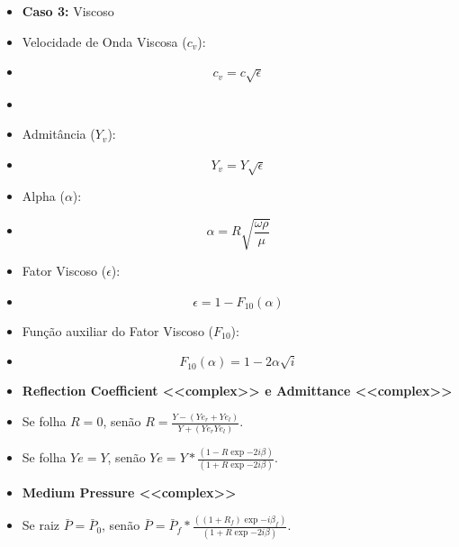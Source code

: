 \documentclass[10pt]{beamer}
\theoremstyle{remark}
\theoremstyle{definition}
\begin{document}
\begin{frame}[allowframebreaks]
\begin{itemize}
		\end{itemize}
		
		
		\framebreak
		
		\begin{itemize}
			\item \textbf{Caso 3:} Viscoso
			\item Velocidade de Onda Viscosa ($c_v$):
			\item 
					\begin{equation}
					  c_v = c\sqrt{\epsilon}
					\label{10}
					\end{equation}
			\item
			\item Admitância ($Y_v$):
			\item 
					\begin{equation}
					Y_v = Y\sqrt{\epsilon}
					\label{11}
					\end{equation}
			
		\end{itemize}
		
		\framebreak
		
		\begin{itemize}
			\item Alpha ($\alpha$):
			\item 
					\begin{equation}
					  \alpha = R \sqrt{\frac{\omega \rho}{\mu}}
					\label{11}
					\end{equation}
			\item Fator Viscoso ($\epsilon$):
			\item 
					\begin{equation}
					 \epsilon = 1 - F_{10}(\alpha)
					\label{11}
					\end{equation}
			\item Função auxiliar do Fator Viscoso ($ F_{10}$):
			\item 
					\begin{equation}
				    F_{10}(\alpha) = 1 - 2\alpha \sqrt{i}
					\label{11}
					\end{equation}
			
		\end{itemize}
		
		\framebreak
		
		\begin{itemize}
			\item \textbf{Reflection Coefficient <<complex>> e Admittance <<complex>>}
			\item Se folha $ R = 0 $, senão $ R = \frac{Y - (Ye_r + Ye_l)}{Y + (Ye_r Ye_l)}$.
			\item Se folha $ Ye = Y $, senão $ Ye = Y * \frac{(1 - R\exp{-2i\beta})}{(1 + R\exp{-2i\beta})}$.
			\item \textbf{Medium Pressure <<complex>>}
			\item Se raiz $ \bar{P} = \bar{P}_0 $, senão $ \bar{P} = \bar{P}_f * \frac{((1 + R_f)\exp{-i\beta_f})}{(1 + R\exp{-2i\beta})}$.
		\end{itemize}
		

\end{frame}
\end{document}

